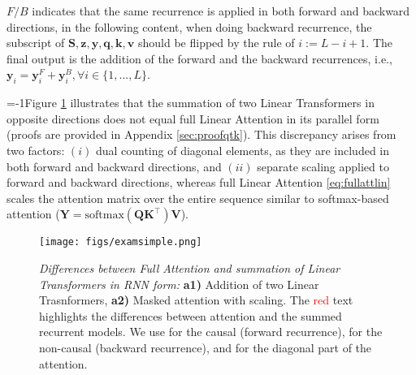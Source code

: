$F/B$ indicates that the same recurrence is applied in both forward and backward directions, in the following content, when doing backward recurrence, the subscript of $\mathbf{S}, \mathbf{z},\mathbf{y},\mathbf{q},  \mathbf{k}, \mathbf{v}$ should be flipped by the rule of $i:= L-i+1$.
The final output is the addition of the forward and the backward recurrences, i.e., $\mathbf{y}_i = \mathbf{y}^F_i + \mathbf{y}^B_{i}, \forall i \in \{1,...,L\}$. 


\looseness=-1Figure \ref{fig:matrixexample} illustrates that the summation of two Linear Transformers in opposite directions does not equal full Linear Attention in its parallel form (proofs are provided in Appendix \ref{sec:proofqtk}). This discrepancy arises from two factors: $(i)$ dual counting of diagonal elements, as they are included in both forward and backward directions, and $(ii)$ separate scaling applied to forward and backward directions, whereas full Linear Attention \eqref{eq:fullattlin} scales the attention matrix over the entire sequence similar to softmax-based attention ($\mathbf{Y} = \text{softmax}\left(\mathbf{Q} \mathbf{K}^\top \right) \mathbf{V}$).

\begin{figure}[t]
    \centering
    \texttt{[image: figs/examsimple.png]}
    \vspace{-5mm}
    \hspace{-2mm}
  \caption{\textit{Differences between Full Attention and summation of Linear Transformers in RNN form:} \textbf{a1)} Addition of two Linear Trasnformers, \textbf{a2)} Masked attention with scaling. The \textcolor{red}{red} text highlights the differences between attention and the summed recurrent models. We use  for the causal (forward recurrence),  for the non-causal (backward recurrence), and  for the diagonal part of the attention.} 
    \label{fig:matrixexample}
    \vspace{-5mm}
\end{figure}

